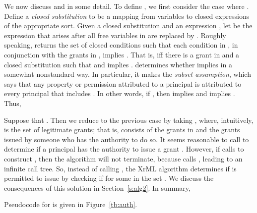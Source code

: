 \documentclass{acmtrans2m}
\newcommand{\<}{
}
\renewcommand{\>}{\rangle}
\begin{document}
We now discuss  and  in some detail.  To define , we first consider the case where
.  Define a \emph{closed substitution} to be a mapping from variables to closed
expressions of the appropriate sort.  Given a closed substitution  and an expression , let
 be the expression that arises after all free variables  in  are replaced by
.  Roughly speaking,  returns the set  of closed conditions such
that each condition in , in conjunction with the grants in , implies .  That is, 
iff there is a grant  in  and a closed
substitution  such that  and  implies .   determines
whether  implies  in a somewhat nonstandard way.  In particular, it makes the
\emph{subset assumption}, which says that any property or permission attributed to a principal  is
attributed to every principal that includes .  In other words, if , then 
implies  and  implies .  Thus,



\begin{sloppypar}
Suppose that .  Then we reduce to the previous case by taking
, where, intuitively,  is the set of legitimate grants;
that is,  consists of the grants in  and the grants issued by someone who has the authority
to do so.  It seems reasonable to call  to determine if a
principal  has the authority to issue a grant .  However, if  calls
 to construct , then the algorithm will not terminate,
because  calls , leading to an infinite call tree.  So, instead of calling
, the XrML algorithm determines if  is permitted to
issue  by checking if  for some  in the set
.  We discuss the consequences of this solution
in Section~\ref{s:alg2}.  In summary,

Pseudocode for  is given in Figure~\ref{tb:auth}.
\end{sloppypar}
\end{document}
